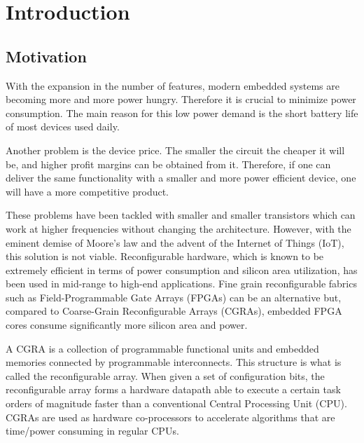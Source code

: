 
\chapter{Introduction}
\label{chapter:introduction}

\section{Motivation}
\label{section:motivation}

With the expansion in the number of features, modern embedded systems
are becoming more and more power hungry. Therefore it is crucial to
minimize power consumption. The main reason for this low power demand
is the short battery life of most devices used daily.

Another problem is the device price. The smaller the circuit the
cheaper it will be, and higher profit margins can be obtained from
it. Therefore, if one can deliver the same functionality with a
smaller and more power efficient device, one will have a more
competitive product.

These problems have been tackled with smaller and smaller transistors
which can work at higher frequencies without changing the
architecture. However, with the eminent demise of Moore's law and the
advent of the Internet of Things (IoT), this solution is not
viable. Reconfigurable hardware, which is known to be extremely
efficient in terms of power consumption and silicon area utilization,
has been used in mid-range to high-end applications. Fine grain
reconfigurable fabrics such as Field-Programmable Gate Arrays (FPGAs)
can be an alternative but, compared to Coarse-Grain Reconfigurable Arrays
(CGRAs), embedded FPGA cores consume significantly more silicon area and
power.

A CGRA is a collection of programmable functional units and embedded
memories connected by programmable interconnects. This structure is
what is called the reconfigurable array. When given a set of
configuration bits, the reconfigurable array forms a hardware datapath
able to execute a certain task orders of magnitude faster than a
conventional Central Processing Unit (CPU). CGRAs are used as hardware
co-processors to accelerate algorithms that are time/power consuming in
regular CPUs.

